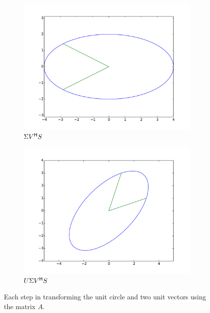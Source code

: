 \begin{figure}
\begin{subfigure}[b]{.49\textwidth}
  \includegraphics[width=\textwidth]{svcircle.pdf}
  \caption{$\Sigma V^{\mathsf H} S$}
\end{subfigure}
\begin{subfigure}[b]{.49\textwidth}
  \centering
  \includegraphics[width=\textwidth]{full_transformation.pdf}
  \caption{$U \Sigma V^{\mathsf H} S$}
\end{subfigure}
\caption{Each step in transforming the unit circle and two unit vectors using the matrix $A$.}
\label{fig:sol1}
\end{figure}

